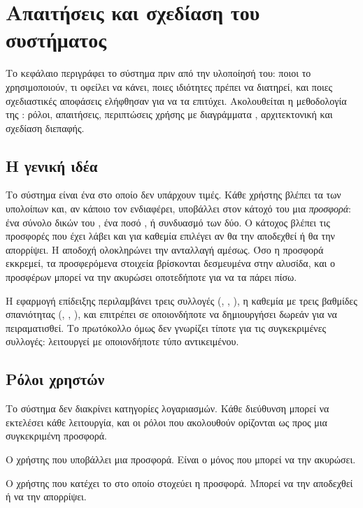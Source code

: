 \chapter{Απαιτήσεις και σχεδίαση του συστήματος}
\label{ch:apaitiseis}

Το κεφάλαιο περιγράφει το σύστημα πριν από την υλοποίησή του: ποιοι το χρησιμοποιούν, τι
οφείλει να κάνει, ποιες ιδιότητες πρέπει να διατηρεί, και ποιες σχεδιαστικές αποφάσεις
ελήφθησαν για να τα επιτύχει. Ακολουθείται η μεθοδολογία της \cite{hadjichristofi2022}:
ρόλοι, απαιτήσεις, περιπτώσεις χρήσης με διαγράμματα  \cite{uml}, αρχιτεκτονική και
σχεδίαση διεπαφής.

\section{Η γενική ιδέα}
\label{sec:idea}

Το σύστημα είναι ένα  στο οποίο δεν υπάρχουν τιμές. Κάθε χρήστης βλέπει τα
 των υπολοίπων και, αν κάποιο τον ενδιαφέρει, υποβάλλει στον κάτοχό του μια
\emph{προσφορά}: ένα σύνολο δικών του , ένα ποσό , ή συνδυασμό των δύο. Ο
κάτοχος βλέπει τις προσφορές που έχει λάβει και για καθεμία επιλέγει αν θα την αποδεχθεί ή
θα την απορρίψει. Η αποδοχή ολοκληρώνει την ανταλλαγή αμέσως. Όσο η προσφορά εκκρεμεί, τα
προσφερόμενα στοιχεία βρίσκονται δεσμευμένα στην αλυσίδα, και ο προσφέρων μπορεί να την
ακυρώσει οποτεδήποτε για να τα πάρει πίσω.

Η εφαρμογή επίδειξης περιλαμβάνει τρεις συλλογές (, , ), η
καθεμία με τρεις βαθμίδες σπανιότητας (, , ), και επιτρέπει
σε οποιονδήποτε να δημιουργήσει δωρεάν  για να πειραματισθεί. Το πρωτόκολλο όμως
δεν γνωρίζει τίποτε για τις συγκεκριμένες συλλογές: λειτουργεί με οποιονδήποτε τύπο
αντικειμένου.

\section{Ρόλοι χρηστών}
\label{sec:roles}

Το σύστημα δεν διακρίνει κατηγορίες λογαριασμών. Κάθε διεύθυνση μπορεί να εκτελέσει κάθε
λειτουργία, και οι ρόλοι που ακολουθούν ορίζονται ως προς μια συγκεκριμένη προσφορά.

\begin{description}[leftmargin=1.2em,itemsep=2pt]
  \item[Προσφέρων (\en{bidder}).] Ο χρήστης που υποβάλλει μια προσφορά. Είναι ο μόνος που
    μπορεί να την ακυρώσει.
  \item[Κάτοχος (\en{owner}).] Ο χρήστης που κατέχει το  στο οποίο στοχεύει η
    προσφορά. Μπορεί να την αποδεχθεί ή να την απορρίψει.
\end{description}

